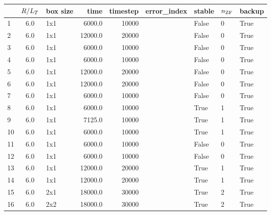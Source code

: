 \newpage

\begin{center}
    \captionsetup{type=table}
    \begin{tabular}{l | c | l | r r l | l l | l }
            & $R/L_T$ & box size & time    & timestep    & error\_index & stable   & $n_\mathrm{ZF}$ & backup \\ \hline 
        1   & 6.0    & 1x1      &  6000.0 & 10000       & ~            & False    & 0      & True   \\ 
        2   & 6.0    & 1x1      & 12000.0 & 20000       & ~            & False    & 0      & True   \\ 
        3   & 6.0    & 1x1      &  6000.0 & 10000       & ~            & False    & 0      & True   \\ 
        4   & 6.0    & 1x1      &  6000.0 & 10000       & ~            & False    & 0      & True   \\ 
        5   & 6.0    & 1x1      & 12000.0 & 20000       & ~            & False    & 0      & True   \\ 
        6   & 6.0    & 1x1      & 12000.0 & 20000       & ~            & False    & 0      & True   \\ 
        7   & 6.0    & 1x1      &  6000.0 & 10000       & ~            & False    & 0      & True   \\ 
        8   & 6.0    & 1x1      &  6000.0 & 10000       & ~            & True     & 1      & True   \\ 
        9   & 6.0    & 1x1      &  7125.0 & 10000       & ~            & True     & 1      & True   \\ 
        10  & 6.0    & 1x1      &  6000.0 & 10000       & ~            & True     & 1      & True   \\ 
        11  & 6.0    & 1x1      &  6000.0 & 10000       & ~            & False    & 0      & True   \\ 
        12  & 6.0    & 1x1      &  6000.0 & 10000       & ~            & False    & 0      & True   \\ 
        13  & 6.0    & 1x1      & 12000.0 & 20000       & ~            & True     & 1      & True   \\ 
        14  & 6.0    & 1x1      & 12000.0 & 20000       & ~            & True     & 1      & True   \\ 
        15  & 6.0    & 2x1      & 18000.0 & 30000       & ~            & True     & 2      & True   \\ 
        16  & 6.0    & 2x2      & 18000.0 & 30000       & ~            & True     & 2      & True   \\ 

\end{tabular}
\end{center}

